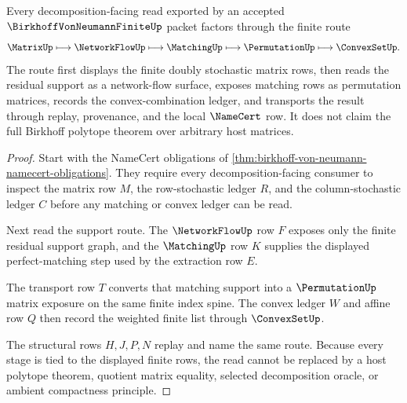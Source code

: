 \begin{theorem}
\label{thm:birkhoff-von-neumann-permutation-flow-route}
Every decomposition-facing read exported by an accepted $\BirkhoffVonNeumannFiniteUp$ packet factors through the finite route
$$
\MatrixUp \longmapsto \NetworkFlowUp \longmapsto \MatchingUp \longmapsto \PermutationUp \longmapsto \ConvexSetUp .
$$
The route first displays the finite doubly stochastic matrix rows, then reads the residual support as a network-flow surface, exposes matching rows as permutation matrices, records the convex-combination ledger, and transports the result through replay, provenance, and the local $\NameCert$ row. It does not claim the full Birkhoff polytope theorem over arbitrary host matrices.
\end{theorem}
\begin{proof}
Start with the NameCert obligations of \autoref{thm:birkhoff-von-neumann-namecert-obligations}. They require every decomposition-facing consumer to inspect the matrix row $M$, the row-stochastic ledger $R$, and the column-stochastic ledger $C$ before any matching or convex ledger can be read.

Next read the support route. The $\NetworkFlowUp$ row $F$ exposes only the finite residual support graph, and the $\MatchingUp$ row $K$ supplies the displayed perfect-matching step used by the extraction row $E$.

The transport row $T$ converts that matching support into a $\PermutationUp$ matrix exposure on the same finite index spine. The convex ledger $W$ and affine row $Q$ then record the weighted finite list through $\ConvexSetUp$.

The structural rows $H,J,P,N$ replay and name the same route. Because every stage is tied to the displayed finite rows, the read cannot be replaced by a host polytope theorem, quotient matrix equality, selected decomposition oracle, or ambient compactness principle.
\end{proof}


